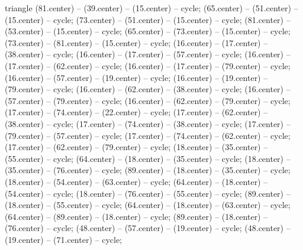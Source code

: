 \begin{pgfonlayer}{triangle}
 (81.center) -- (39.center) -- (15.center) -- cycle; 
 (65.center) -- (51.center) -- (15.center) -- cycle; 
 (73.center) -- (51.center) -- (15.center) -- cycle; 
 (81.center) -- (53.center) -- (15.center) -- cycle; 
 (65.center) -- (73.center) -- (15.center) -- cycle; 
 (73.center) -- (81.center) -- (15.center) -- cycle; 
 (16.center) -- (17.center) -- (38.center) -- cycle; 
 (16.center) -- (17.center) -- (57.center) -- cycle; 
 (16.center) -- (17.center) -- (62.center) -- cycle; 
 (16.center) -- (17.center) -- (79.center) -- cycle; 
 (16.center) -- (57.center) -- (19.center) -- cycle; 
 (16.center) -- (19.center) -- (79.center) -- cycle; 
 (16.center) -- (62.center) -- (38.center) -- cycle; 
 (16.center) -- (57.center) -- (79.center) -- cycle; 
 (16.center) -- (62.center) -- (79.center) -- cycle; 
 (17.center) -- (74.center) -- (22.center) -- cycle; 
 (17.center) -- (62.center) -- (38.center) -- cycle; 
 (17.center) -- (74.center) -- (38.center) -- cycle; 
 (17.center) -- (79.center) -- (57.center) -- cycle; 
 (17.center) -- (74.center) -- (62.center) -- cycle; 
 (17.center) -- (62.center) -- (79.center) -- cycle; 
 (18.center) -- (35.center) -- (55.center) -- cycle; 
 (64.center) -- (18.center) -- (35.center) -- cycle; 
 (18.center) -- (35.center) -- (76.center) -- cycle; 
 (89.center) -- (18.center) -- (35.center) -- cycle; 
 (18.center) -- (54.center) -- (63.center) -- cycle; 
 (64.center) -- (18.center) -- (54.center) -- cycle; 
 (18.center) -- (76.center) -- (55.center) -- cycle; 
 (89.center) -- (18.center) -- (55.center) -- cycle; 
 (64.center) -- (18.center) -- (63.center) -- cycle; 
 (64.center) -- (89.center) -- (18.center) -- cycle; 
 (89.center) -- (18.center) -- (76.center) -- cycle; 
 (48.center) -- (57.center) -- (19.center) -- cycle; 
 (48.center) -- (19.center) -- (71.center) -- cycle; 

\end{pgfonlayer}
